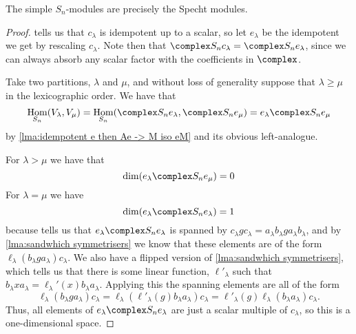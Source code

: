 \documentclass[fleqn]{NotesClass}
\DeclareMathOperator{\Hom}{Hom}
\begin{document}
    \begin{thm}{}{}
        The simple \(S_n\)-modules are precisely the Specht modules.
        \begin{proof}
             tells us that \(c_\lambda\) is idempotent up to a scalar, so let \(e_\lambda\) be the idempotent we get by rescaling \(c_\lambda\).
            Note then that \(\complex S_n c_\lambda = \complex S_n e_\lambda\), since we can always absorb any scalar factor with the coefficients in \(\complex\).
            
            Take two partitions, \(\lambda\) and \(\mu\), and without loss of generality suppose that \(\lambda \ge \mu\) in the lexicographic order.
            We have that
            \begin{equation}
                \Hom_{S_n}(V_\lambda, V_\mu) = \Hom_{S_n}(\complex S_n e_\lambda, \complex S_n e_\mu) = e_\lambda \complex S_n e_\mu
            \end{equation}
            by \cref{lma:idempotent e then Ae -> M iso eM} and its obvious left-analogue.
            
            For \(\lambda > \mu\) we have that
            \begin{equation}
                \dim(e_\lambda \complex S_n e_\mu) = 0
            \end{equation}
            For \(\lambda = \mu\) we have
            \begin{equation}
                \dim(e_\lambda \complex S_n e_\lambda) = 1
            \end{equation}
            because tells us that \(e_\lambda \complex S_n e_\lambda\) is spanned by \(c_\lambda g c_\lambda = a_\lambda b_\lambda g a_\lambda b_\lambda\), and by \cref{lma:sandwhich symmetrisers} we know that these elements are of the form \(\ell_\lambda(b_\lambda g a_\lambda) c_\lambda\).
            We also have a flipped version of \cref{lma:sandwhich symmetrisers}, which tells us that there is some linear function, \(\ell'_\lambda\) such that \(b_\lambda x a_\lambda = \ell_\lambda'(x)b_\lambda a_\lambda\).
            Applying this the spanning elements are all of the form
            \begin{equation}
                \ell_\lambda(b_\lambda g a_\lambda) c_\lambda = \ell_\lambda(\ell'_\lambda(g)b_\lambda a_\lambda) c_\lambda = \ell'_\lambda(g)\ell_\lambda(b_\lambda a_\lambda) c_\lambda.
            \end{equation}
            Thus, all elements of \(e_\lambda \complex S_n e_\lambda\) are just a scalar multiple of \(c_\lambda\), so this is a one-dimensional space.
            

\end{proof}
\end{thm}
\end{document}
